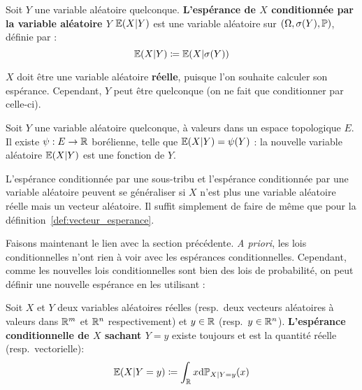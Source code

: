 \documentclass[../integ-proba.tex]{subfiles}
\begin{document}
    \begin{defi}
        Soit $Y$ une variable aléatoire quelconque.
        \textbf{L'espérance de $X$ conditionnée par la variable aléatoire $Y$ $\mathbb{E}(X | Y)$} est une variable aléatoire sur $\left( \Omega, \sigma(Y), \mathbb{P} \right)$, définie par :
        \begin{displaymath}
            \mathbb{E}(X | Y) \coloneqq \mathbb{E}(X | \sigma(Y))
        \end{displaymath}
    \end{defi}

    \begin{rem}
        $X$ doit être une variable aléatoire \textbf{réelle}, puisque l'on souhaite calculer son espérance.
        Cependant, $Y$ peut être quelconque (on ne fait que conditionner par celle-ci).
    \end{rem}

    \begin{prop}
        Soit $Y$ une variable aléatoire quelconque, à valeurs dans un espace topologique $E$.
        Il existe $\psi : E \rightarrow \mathbb{R}$ borélienne, telle que $\mathbb{E}(X | Y) = \psi(Y)$ : la nouvelle variable aléatoire $\mathbb{E}(X | Y)$ est une fonction de $Y$.
    \end{prop}

    \begin{rem}
        L'espérance conditionnée par une sous-tribu et l'espérance conditionnée par une variable aléatoire peuvent se généraliser si $X$ n'est plus une variable aléatoire réelle mais un vecteur aléatoire.
        Il suffit simplement de faire de même que pour la définition~\ref{def:vecteur_esperance}.
    \end{rem}

    Faisons maintenant le lien avec la section précédente.
    \textit{A priori}, les lois conditionnelles n'ont rien à voir avec les espérances conditionnelles.
    Cependant, comme les nouvelles lois conditionnelles sont bien des lois de probabilité, on peut définir une nouvelle espérance en les utilisant :

    \begin{defi}
        Soit $X$ et $Y$ deux variables aléatoires réelles (resp.\ deux vecteurs aléatoires à valeurs dans $\mathbb{R}^m$ et $\mathbb{R}^n$ respectivement) et $y \in \mathbb{R}$ (resp.\ $y \in \mathbb{R}^n$).
        \textbf{L'espérance conditionnelle de $X$ sachant $Y = y$} existe toujours et est la quantité réelle (resp.\ vectorielle):
        \begin{displaymath}
            \mathbb{E}(X | Y = y) \coloneqq \int_{\mathbb{R}} x \textnormal{d} \mathbb{P}_{X | Y=y}(x)
        \end{displaymath}
    \end{defi}
\end{document}
